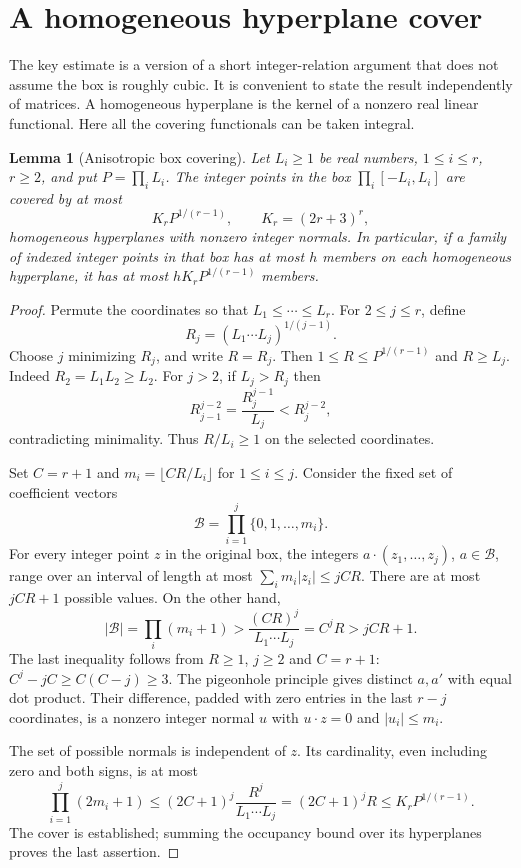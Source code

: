 \documentclass[11pt]{article}
\newtheorem{lemma}[theorem]{Lemma}
\theoremstyle{remark}\newtheorem{remark}[theorem]{Remark}
\begin{document}
\section{A homogeneous hyperplane cover}
The key estimate is a version of a short integer-relation argument that does not assume the box is roughly cubic. It is convenient to state the result independently of matrices. A homogeneous hyperplane is the kernel of a nonzero real linear functional. Here all the covering functionals can be taken integral.

\begin{lemma}[Anisotropic box covering]\label{lem:box}
Let $L_i\ge1$ be real numbers, $1\le i\le r$, $r\ge2$, and put $P=\prod_i L_i$. The integer points in the box $\prod_i[-L_i,L_i]$ are covered by at most
\begin{equation}\label{eq:cover}
 K_r P^{1/(r-1)},\qquad K_r=(2r+3)^r,
\end{equation}
homogeneous hyperplanes with nonzero integer normals. In particular, if a family of indexed integer points in that box has at most $h$ members on each homogeneous hyperplane, it has at most $h K_r P^{1/(r-1)}$ members.
\end{lemma}

\begin{proof}
Permute the coordinates so that $L_1\le\cdots\le L_r$. For $2\le j\le r$, define
\[
 R_j=(L_1\cdots L_j)^{1/(j-1)}.
\]
Choose $j$ minimizing $R_j$, and write $R=R_j$. Then $1\le R\le P^{1/(r-1)}$ and $R\ge L_j$. Indeed $R_2=L_1L_2\ge L_2$. For $j>2$, if $L_j>R_j$ then
\[
 R_{j-1}^{j-2}=\frac{R_j^{j-1}}{L_j}<R_j^{j-2},
\]
contradicting minimality. Thus $R/L_i\ge1$ on the selected coordinates.

Set $C=r+1$ and $m_i=\lfloor CR/L_i\rfloor$ for $1\le i\le j$. Consider the fixed set of coefficient vectors
\[
 \mathcal B=\prod_{i=1}^j\{0,1,\ldots,m_i\}.
\]
For every integer point $z$ in the original box, the integers $a\cdot(z_1,\ldots,z_j)$, $a\in\mathcal B$, range over an interval of length at most $\sum_i m_i|z_i|\le jCR$. There are at most $jCR+1$ possible values. On the other hand,
\[
 |\mathcal B|=\prod_i(m_i+1)>\frac{(CR)^j}{L_1\cdots L_j}=C^jR>jCR+1.
\]
The last inequality follows from $R\ge1$, $j\ge2$ and $C=r+1$: $C^j-jC\ge C(C-j)\ge3$. The pigeonhole principle gives distinct $a,a'$ with equal dot product. Their difference, padded with zero entries in the last $r-j$ coordinates, is a nonzero integer normal $u$ with $u\cdot z=0$ and $|u_i|\le m_i$.

The set of possible normals is independent of $z$. Its cardinality, even including zero and both signs, is at most
\[
 \prod_{i=1}^j(2m_i+1)\le(2C+1)^j\frac{R^j}{L_1\cdots L_j}
 =(2C+1)^jR\le K_r P^{1/(r-1)}.
\]
The cover is established; summing the occupancy bound over its hyperplanes proves the last assertion.
\end{proof}
\end{document}
